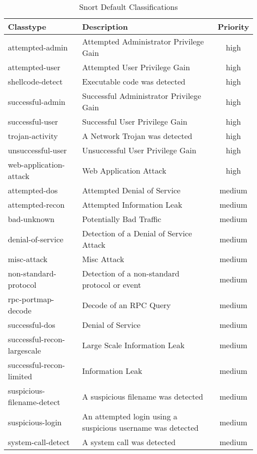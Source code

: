 \documentclass[english]{report}
\begin{document}
\begin{center}
\begin{longtable}{|p{2in}|p{2.5in}|c|}
\caption{Snort Default Classifications \label{Snort Default Classifications}} \\
\hline 
Classtype & Description & Priority \\
\hline
\hline 
attempted-admin&
Attempted Administrator Privilege Gain & high \\
\hline 
attempted-user&
Attempted User Privilege Gain & high\\
\hline 
shellcode-detect&
Executable code was detected & high\\
\hline 
successful-admin&
Successful Administrator Privilege Gain & high\\
\hline 
successful-user&
Successful User Privilege Gain & high\\
\hline 
trojan-activity&
A Network Trojan was detected & high\\
\hline 
unsuccessful-user&
Unsuccessful User Privilege Gain & high\\
\hline 
web-application-attack&
Web Application Attack & high\\
\hline
attempted-dos&
Attempted Denial of Service & medium\\
\hline 
attempted-recon&
Attempted Information Leak & medium\\
\hline 
bad-unknown&
Potentially Bad Traffic & medium\\
\hline 
denial-of-service&
Detection of a Denial of Service Attack & medium\\
\hline 
misc-attack&
Misc Attack & medium\\
\hline 
non-standard-protocol&
Detection of a non-standard protocol or event & medium\\
\hline 
rpc-portmap-decode&
Decode of an RPC Query & medium\\
\hline 
successful-dos&
Denial of Service & medium\\
\hline 
successful-recon-largescale&
Large Scale Information Leak & medium\\
\hline 
successful-recon-limited&
Information Leak & medium\\
\hline 
suspicious-filename-detect&
A suspicious filename was detected & medium\\
\hline 
suspicious-login&
An attempted login using a suspicious username was detected & medium\\
\hline 
system-call-detect&
A system call was detected & medium\\

\end{longtable}
\end{center}
\end{document}
